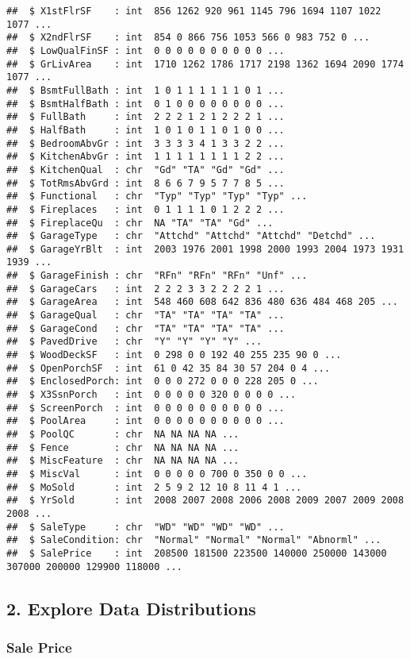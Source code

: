 \documentclass[
]{article}
\begin{document}
\begin{verbatim}
##  $ X1stFlrSF    : int  856 1262 920 961 1145 796 1694 1107 1022 1077 ...
##  $ X2ndFlrSF    : int  854 0 866 756 1053 566 0 983 752 0 ...
##  $ LowQualFinSF : int  0 0 0 0 0 0 0 0 0 0 ...
##  $ GrLivArea    : int  1710 1262 1786 1717 2198 1362 1694 2090 1774 1077 ...
##  $ BsmtFullBath : int  1 0 1 1 1 1 1 1 0 1 ...
##  $ BsmtHalfBath : int  0 1 0 0 0 0 0 0 0 0 ...
##  $ FullBath     : int  2 2 2 1 2 1 2 2 2 1 ...
##  $ HalfBath     : int  1 0 1 0 1 1 0 1 0 0 ...
##  $ BedroomAbvGr : int  3 3 3 3 4 1 3 3 2 2 ...
##  $ KitchenAbvGr : int  1 1 1 1 1 1 1 1 2 2 ...
##  $ KitchenQual  : chr  "Gd" "TA" "Gd" "Gd" ...
##  $ TotRmsAbvGrd : int  8 6 6 7 9 5 7 7 8 5 ...
##  $ Functional   : chr  "Typ" "Typ" "Typ" "Typ" ...
##  $ Fireplaces   : int  0 1 1 1 1 0 1 2 2 2 ...
##  $ FireplaceQu  : chr  NA "TA" "TA" "Gd" ...
##  $ GarageType   : chr  "Attchd" "Attchd" "Attchd" "Detchd" ...
##  $ GarageYrBlt  : int  2003 1976 2001 1998 2000 1993 2004 1973 1931 1939 ...
##  $ GarageFinish : chr  "RFn" "RFn" "RFn" "Unf" ...
##  $ GarageCars   : int  2 2 2 3 3 2 2 2 2 1 ...
##  $ GarageArea   : int  548 460 608 642 836 480 636 484 468 205 ...
##  $ GarageQual   : chr  "TA" "TA" "TA" "TA" ...
##  $ GarageCond   : chr  "TA" "TA" "TA" "TA" ...
##  $ PavedDrive   : chr  "Y" "Y" "Y" "Y" ...
##  $ WoodDeckSF   : int  0 298 0 0 192 40 255 235 90 0 ...
##  $ OpenPorchSF  : int  61 0 42 35 84 30 57 204 0 4 ...
##  $ EnclosedPorch: int  0 0 0 272 0 0 0 228 205 0 ...
##  $ X3SsnPorch   : int  0 0 0 0 0 320 0 0 0 0 ...
##  $ ScreenPorch  : int  0 0 0 0 0 0 0 0 0 0 ...
##  $ PoolArea     : int  0 0 0 0 0 0 0 0 0 0 ...
##  $ PoolQC       : chr  NA NA NA NA ...
##  $ Fence        : chr  NA NA NA NA ...
##  $ MiscFeature  : chr  NA NA NA NA ...
##  $ MiscVal      : int  0 0 0 0 0 700 0 350 0 0 ...
##  $ MoSold       : int  2 5 9 2 12 10 8 11 4 1 ...
##  $ YrSold       : int  2008 2007 2008 2006 2008 2009 2007 2009 2008 2008 ...
##  $ SaleType     : chr  "WD" "WD" "WD" "WD" ...
##  $ SaleCondition: chr  "Normal" "Normal" "Normal" "Abnorml" ...
##  $ SalePrice    : int  208500 181500 223500 140000 250000 143000 307000 200000 129900 118000 ...
\end{verbatim}

\hypertarget{explore-data-distributions}{%
\subsection{2. Explore Data
Distributions}\label{explore-data-distributions}}

\hypertarget{sale-price}{%
\subsubsection{Sale Price}\label{sale-price}}
\end{document}
